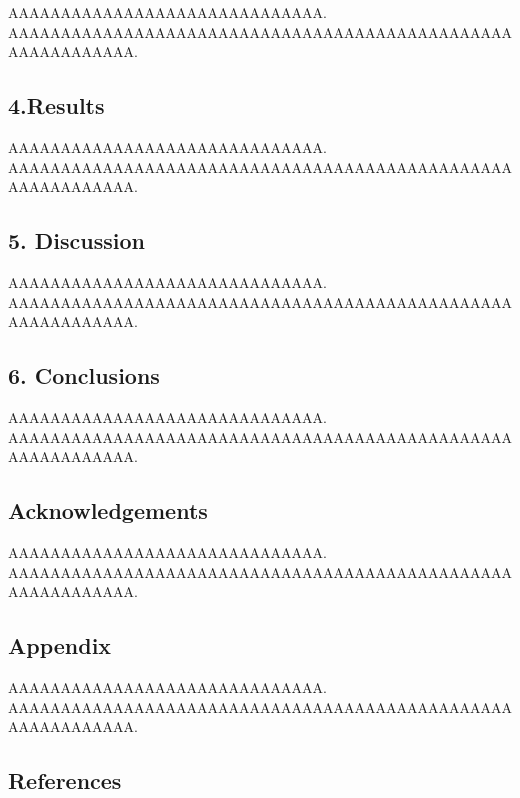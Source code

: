 \documentclass[
  xelatex,ja=standard]{article}
\begin{document}
AAAAAAAAAAAAAAAAAAAAAAAAAAAAAA.\\
AAAAAAAAAAAAAAAAAAAAAAAAAAAAAAAAAAAAAAAAAAAAAAAAAAAAAAAAAAAA.

\hypertarget{results}{%
\subsection{4.Results}\label{results}}

AAAAAAAAAAAAAAAAAAAAAAAAAAAAAA.\\
AAAAAAAAAAAAAAAAAAAAAAAAAAAAAAAAAAAAAAAAAAAAAAAAAAAAAAAAAAAA.

\hypertarget{discussion}{%
\subsection{5. Discussion}\label{discussion}}

AAAAAAAAAAAAAAAAAAAAAAAAAAAAAA.\\
AAAAAAAAAAAAAAAAAAAAAAAAAAAAAAAAAAAAAAAAAAAAAAAAAAAAAAAAAAAA.

\hypertarget{conclusions}{%
\subsection{6. Conclusions}\label{conclusions}}

AAAAAAAAAAAAAAAAAAAAAAAAAAAAAA.\\
AAAAAAAAAAAAAAAAAAAAAAAAAAAAAAAAAAAAAAAAAAAAAAAAAAAAAAAAAAAA.

\hypertarget{acknowledgements}{%
\subsection{Acknowledgements}\label{acknowledgements}}

AAAAAAAAAAAAAAAAAAAAAAAAAAAAAA.\\
AAAAAAAAAAAAAAAAAAAAAAAAAAAAAAAAAAAAAAAAAAAAAAAAAAAAAAAAAAAA.

\hypertarget{appendix}{%
\subsection{Appendix}\label{appendix}}

AAAAAAAAAAAAAAAAAAAAAAAAAAAAAA.\\
AAAAAAAAAAAAAAAAAAAAAAAAAAAAAAAAAAAAAAAAAAAAAAAAAAAAAAAAAAAA.

\hypertarget{references}{%
\subsection{References}\label{references}}
\end{document}
